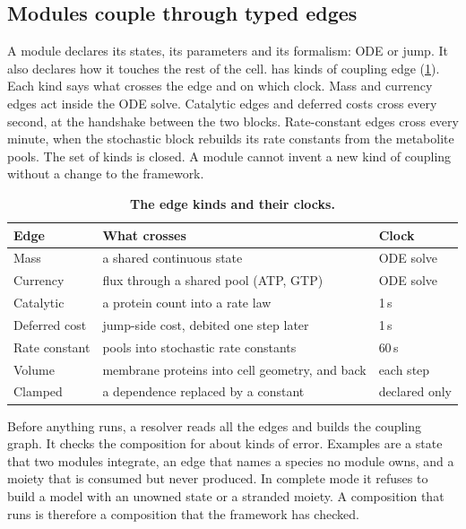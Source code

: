 \subsection{Modules couple through typed edges}

A module declares its states, its parameters and its formalism: ODE or jump. It
also declares how it touches the rest of the cell. \IC{} has  kinds
of coupling edge (\cref{tab:edges}). Each kind says what crosses the edge and on
which clock. Mass and currency edges act inside the ODE solve. Catalytic edges
and deferred costs cross every second, at the handshake between the two blocks.
Rate-constant edges cross every minute, when the stochastic block rebuilds its rate
constants from the metabolite pools. The set of kinds is closed. A module cannot
invent a new kind of coupling without a change to the framework.

\begin{table}[!ht]
\caption{\textbf{The  edge kinds and their clocks.}}
\label{tab:edges}
\centering
\small
\begin{tabular}{@{}p{}p{}p{}@{}}
\toprule
Edge & What crosses & Clock \\
\midrule
Mass & a shared continuous state & ODE solve \\
Currency & flux through a shared pool (ATP, GTP) & ODE solve \\
Catalytic & a protein count into a rate law & 1\,s \\
Deferred cost & jump-side cost, debited one step later & 1\,s \\
Rate constant & pools into stochastic rate constants & 60\,s \\
Volume & membrane proteins into cell geometry, and back & each step \\
Clamped & a dependence replaced by a constant & declared only \\
\bottomrule
\end{tabular}
\end{table}

Before anything runs, a resolver reads all the edges and builds the coupling graph.
It checks the composition for about  kinds of error. Examples are a state that
two modules integrate, an edge that names a species no module owns, and a moiety
that is consumed but never produced. In complete mode it refuses to build a model
with an unowned state or a stranded moiety. A composition that runs is therefore
a composition that the framework has checked.

